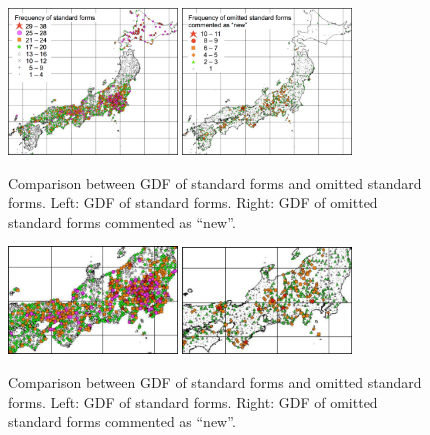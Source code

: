 \documentclass[output=paper]{LSP/langsci}
\begin{document}
\begin{figure}
\includegraphics[width=0.4\textwidth]{illustrations/kuma_fig16-a}
\includegraphics[width=0.4\textwidth]{illustrations/kuma_fig16-b}
\caption{Comparison between GDF of standard forms and omitted standard forms. Left: GDF of standard forms. Right: GDF of omitted standard forms commented as “new”.}          
\label{fig:16}
\end{figure}

\begin{figure}
\includegraphics[width=0.4\textwidth]{illustrations/kuma_fig17-a}
\includegraphics[width=0.4\textwidth]{illustrations/kuma_fig17-b}
\caption{Comparison between GDF of standard forms and omitted standard forms. Left: GDF of standard forms. Right: GDF of omitted standard forms commented as “new”.}          
\label{fig:17}
\end{figure}
 
\end{document}
